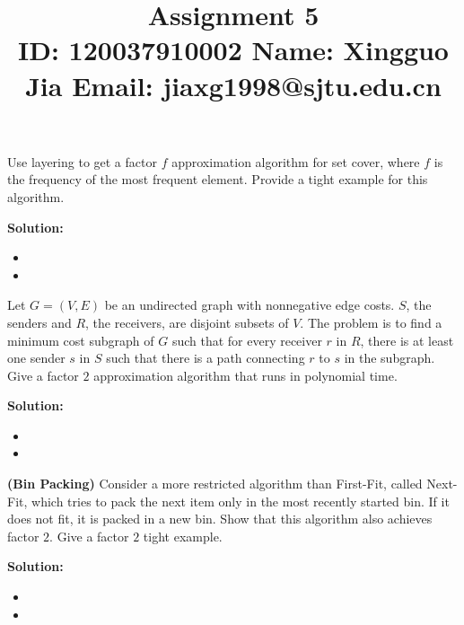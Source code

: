 \documentclass{article}
\title{{\bf Assignment 5} \\ {\large ID: 120037910002 } {\large Name: Xingguo Jia } {\large Email: jiaxg1998@sjtu.edu.cn}}
\author{}
\date{}
\newcounter{exercise}
\newcommand{\<}{
    \langle}
\renewcommand{\>}{
    \rangle}
\begin{document}
\maketitle


{\large

\begin{exercise}
Use layering to get a factor $f$ approximation algorithm for set cover,
where $f$ is the frequency of the most frequent element. Provide a tight example
for this algorithm.

\end{exercise}

\textbf{Solution:}
\begin{itemize}
	\item
	\item
\end{itemize}
\newpage

\begin{exercise}
	Let $G = (V, E)$ be an undirected graph with nonnegative edge costs. $S$, the senders and $R$, the receivers, are disjoint subsets of $V$. The problem is to find a minimum cost subgraph of $G$ such that for every receiver $r$ in $R$, there is at least one sender $s$ in $S$ such that there is a path connecting $r$ to $s$ in the subgraph. Give a factor $2$ approximation algorithm that runs in polynomial time.
\end{exercise}

\textbf{Solution:}
\begin{itemize}
	\item
	\item
\end{itemize}
\newpage




\begin{exercise}
	\textbf{(Bin Packing)} Consider a more restricted algorithm than First-Fit, called Next-Fit, which tries to pack the next item only in the most recently started bin. If it does not fit, it is packed in a new bin. Show that this algorithm also achieves factor $2$. Give a factor $2$ tight example.
\end{exercise}

\textbf{Solution:}
\begin{itemize}
	\item
	\item
\end{itemize}
\newpage



}
\end{document}
